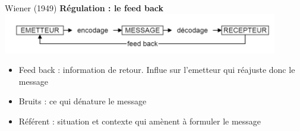 \begin{frame}
	\begin{block}{Wiener (1949)}
		\textbf{Régulation : le feed back} 
		\includegraphics[width=12cm]{wiener.png}
		\begin{itemize}
			\item{Feed back : information de retour. Influe sur l'emetteur qui réajuste donc le message}
			\item{Bruits : ce qui dénature le message}
			\item{Référent : situation et contexte qui amènent à formuler le message}
		\end{itemize}
	\end{block}
\end{frame}
